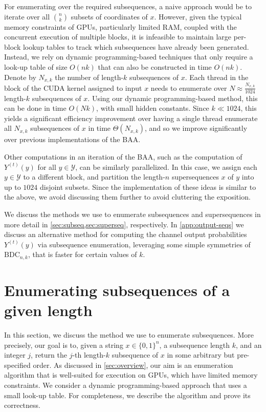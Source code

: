\documentclass[11pt]{article}
\newcommand{\cY}{\mathcal{Y}}
\newcommand{\bits}{\{0,1\}}
\newcommand{\BDC}{\mathrm{BDC}}
\begin{document}
For enumerating over the required subsequences, 
a naive approach would be to iterate over all $\binom{n}{k}$ subsets of coordinates of $x$.
However, given the typical memory constraints of GPUs, particularly limited RAM, coupled with the concurrent execution of multiple blocks, it is infeasible to maintain large per-block lookup tables to track which subsequences have already been generated.
Instead, we rely on dynamic programming-based techniques that only require a look-up table of size $O(nk)$ that can also be constructed in time $O(nk)$.
Denote by $N_{x,k}$ the number of length-$k$ subsequences of $x$.
Each thread in the block of the CUDA kernel assigned to input $x$ needs to enumerate over $N\approx \frac{N_{x,k}}{1024}$ length-$k$ subsequences of $x$.
Using our dynamic programming-based method, this can be done in time $O(Nk)$, with small hidden constants.
Since $k\ll 1024$, this yields a significant efficiency improvement over having a single thread enumerate all $N_{x,k}$ subsequences of $x$ in time $\Theta(N_{x,k})$, and so we improve significantly over previous implementations of the BAA.


Other computations in an iteration of the BAA, such as the computation of $Y^{(t)}(y)$ for all $y\in\cY$, can be similarly parallelized.
In this case, we assign each $y\in\cY$ to a different block, and partition the length-$n$ supersequences $x$ of $y$ into up to $1024$ disjoint subsets.
Since the implementation of these ideas is similar to the above, we avoid discussing them further to avoid cluttering the exposition.

We discuss the methods we use to enumerate subsequences and supersequences in more detail in \cref{sec:subseq,sec:superseq}, respectively.
In \cref{app:output-seqs} we discuss an alternative method for computing the channel output probabilities $Y^{(t)}(y)$ via subsequence enumeration, leveraging some simple symmetries of $\BDC_{n,k}$, that is faster for certain values of $k$.






\section{Enumerating subsequences of a given length}
\label{sec:subseq}


In this section, we discuss the method we use to enumerate subsequences.
More precisely, our goal is to, given a string $x\in\bits^n$, a subsequence length $k$, and an integer $j$, return the $j$-th length-$k$ subsequence of $x$ in some arbitrary but pre-specified order.
As discussed in \cref{sec:overview}, our aim is an enumeration algorithm that is well-suited for execution on GPUs, which have limited memory constraints. 
We consider a dynamic programming-based approach that uses a small look-up table.
For completeness, we describe the algorithm and prove its correctness.
\end{document}
